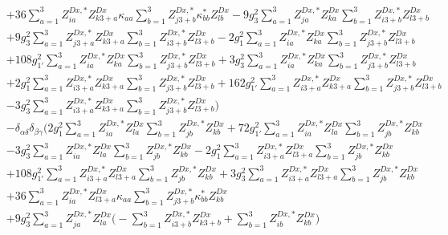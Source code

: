 \begin{align}
 &+36 \sum_{a=1}^{3}Z^{{Dx},*}_{i a} Z_{{k 3 + a}}^{Dx} \kappa_{{a a}}  \sum_{b=1}^{3}Z^{{Dx},*}_{j 3 + b} \kappa^*_{b b} Z_{{l b}}^{Dx}  -9 g_{3}^{2} \sum_{a=1}^{3}Z^{{Dx},*}_{j a} Z_{{k a}}^{Dx}  \sum_{b=1}^{3}Z^{{Dx},*}_{i 3 + b} Z_{{l 3 + b}}^{Dx}  \nonumber \\ 
 &+9 g_{3}^{2} \sum_{a=1}^{3}Z^{{Dx},*}_{j 3 + a} Z_{{k 3 + a}}^{Dx}  \sum_{b=1}^{3}Z^{{Dx},*}_{i 3 + b} Z_{{l 3 + b}}^{Dx}  -2 g_{1}^{2} \sum_{a=1}^{3}Z^{{Dx},*}_{i a} Z_{{k a}}^{Dx}  \sum_{b=1}^{3}Z^{{Dx},*}_{j 3 + b} Z_{{l 3 + b}}^{Dx}  \nonumber \\ 
 &+108 g_{1'}^{2} \sum_{a=1}^{3}Z^{{Dx},*}_{i a} Z_{{k a}}^{Dx}  \sum_{b=1}^{3}Z^{{Dx},*}_{j 3 + b} Z_{{l 3 + b}}^{Dx}  +3 g_{3}^{2} \sum_{a=1}^{3}Z^{{Dx},*}_{i a} Z_{{k a}}^{Dx}  \sum_{b=1}^{3}Z^{{Dx},*}_{j 3 + b} Z_{{l 3 + b}}^{Dx}  \nonumber \\ 
 &+2 g_{1}^{2} \sum_{a=1}^{3}Z^{{Dx},*}_{i 3 + a} Z_{{k 3 + a}}^{Dx}  \sum_{b=1}^{3}Z^{{Dx},*}_{j 3 + b} Z_{{l 3 + b}}^{Dx}  +162 g_{1'}^{2} \sum_{a=1}^{3}Z^{{Dx},*}_{i 3 + a} Z_{{k 3 + a}}^{Dx}  \sum_{b=1}^{3}Z^{{Dx},*}_{j 3 + b} Z_{{l 3 + b}}^{Dx}  \nonumber \\ 
 &-3 g_{3}^{2} \sum_{a=1}^{3}Z^{{Dx},*}_{i 3 + a} Z_{{k 3 + a}}^{Dx}  \sum_{b=1}^{3}Z^{{Dx},*}_{j 3 + b} Z_{{l 3 + b}}^{Dx}  \Big)\nonumber \\ 
 &- \delta_{\alpha \delta} \delta_{\beta \gamma} \Big(2 g_{1}^{2} \sum_{a=1}^{3}Z^{{Dx},*}_{i a} Z_{{l a}}^{Dx}  \sum_{b=1}^{3}Z^{{Dx},*}_{j b} Z_{{k b}}^{Dx}  +72 g_{1'}^{2} \sum_{a=1}^{3}Z^{{Dx},*}_{i a} Z_{{l a}}^{Dx}  \sum_{b=1}^{3}Z^{{Dx},*}_{j b} Z_{{k b}}^{Dx}  \nonumber \\ 
 &-3 g_{3}^{2} \sum_{a=1}^{3}Z^{{Dx},*}_{i a} Z_{{l a}}^{Dx}  \sum_{b=1}^{3}Z^{{Dx},*}_{j b} Z_{{k b}}^{Dx}  -2 g_{1}^{2} \sum_{a=1}^{3}Z^{{Dx},*}_{i 3 + a} Z_{{l 3 + a}}^{Dx}  \sum_{b=1}^{3}Z^{{Dx},*}_{j b} Z_{{k b}}^{Dx}  \nonumber \\ 
 &+108 g_{1'}^{2} \sum_{a=1}^{3}Z^{{Dx},*}_{i 3 + a} Z_{{l 3 + a}}^{Dx}  \sum_{b=1}^{3}Z^{{Dx},*}_{j b} Z_{{k b}}^{Dx}  +3 g_{3}^{2} \sum_{a=1}^{3}Z^{{Dx},*}_{i 3 + a} Z_{{l 3 + a}}^{Dx}  \sum_{b=1}^{3}Z^{{Dx},*}_{j b} Z_{{k b}}^{Dx}  \nonumber \\ 
 &+36 \sum_{a=1}^{3}Z^{{Dx},*}_{i a} Z_{{l 3 + a}}^{Dx} \kappa_{{a a}}  \sum_{b=1}^{3}Z^{{Dx},*}_{j 3 + b} \kappa^*_{b b} Z_{{k b}}^{Dx}  \nonumber \\ 
 &+9 g_{3}^{2} \sum_{a=1}^{3}Z^{{Dx},*}_{j a} Z_{{l a}}^{Dx}  \Big(- \sum_{b=1}^{3}Z^{{Dx},*}_{i 3 + b} Z_{{k 3 + b}}^{Dx}   + \sum_{b=1}^{3}Z^{{Dx},*}_{i b} Z_{{k b}}^{Dx} \Big)\nonumber \\ 

\end{align}
